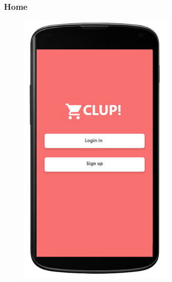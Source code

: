 \subsubsection{Home}
\begin{figure}[H]
  \centering
  \includegraphics[width=0.7\textwidth,keepaspectratio]{images/5.png}
\end{figure}


